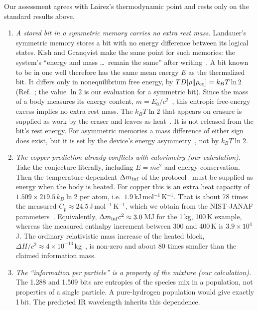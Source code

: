 Our assessment agrees with Lairez's thermodynamic point and rests only on the standard results
above.
\begin{enumerate}
\item \emph{A stored bit in a symmetric memory carries no extra rest mass.} Landauer's symmetric
  memory stores a bit with no energy difference between its logical states. Kish and Granqvist
  make the same point for such memories: the system's ``energy and mass \dots\ remain the same''
  after writing~\cite{Kish2013does}. A bit known to be in one well therefore has the same mean
  energy $E$ as the thermalized bit. It differs only in nonequilibrium free energy, by
  $T D[\rho\Vert\rho_{\rm eq}]=k_BT\ln2$ (Ref.~\cite{Esposito2011second}; the value $\ln 2$ is our
  evaluation for a symmetric bit). Since the mass of a body
  measures its energy content, $m=E_0/c^2$~\cite{Okun2008einstein}, this entropic free-energy
  excess implies no extra rest mass. The $k_BT\ln 2$ that appears on erasure is supplied as work
  by the eraser and leaves as heat~\cite{Jun2014high,Bennett2003notes}. It is not released from
  the bit's rest energy. For asymmetric memories a mass difference of either sign does exist, but
  it is set by the device's energy asymmetry~\cite{Kish2013does}, not by $k_BT\ln2$.
\item \emph{The copper prediction already conflicts with calorimetry (our calculation).} Take the
  conjecture literally, including $E=mc^2$ and energy conservation. Then the temperature-dependent
  $\Delta m_{\rm inf}$ of the protocol~\cite{Vopson2022experimental} must be supplied as energy
  when the body is heated. For copper this is an extra heat capacity of
  $1.509\times219.5\,k_B\ln2$ per atom, i.e.\ $1.9$\,kJ\,mol$^{-1}$\,K$^{-1}$. That is about 78
  times the measured $C_p\approx24.5$\,J\,mol$^{-1}$\,K$^{-1}$, which we obtain from the
  NIST-JANAF parameters~\cite{NIST2026copper}. Equivalently, $\Delta m_{\rm inf}c^2\approx3.0$\,MJ
  for the 1\,kg, 100\,K example, whereas the measured enthalpy increment between 300 and 400\,K is
  $3.9\times10^{4}$\,J. The ordinary relativistic mass increase of the heated block,
  $\Delta H/c^2\approx4\times10^{-13}$\,kg~\cite{Okun2008einstein}, is non-zero and about 80 times smaller than the
  claimed information mass.
\item \emph{The ``information per particle'' is a property of the mixture (our calculation).} The
  1.288 and 1.509 bits are entropies of the species mix in a population, not properties of a
  single particle. A pure-hydrogen population would give exactly 1\,bit. The predicted IR
  wavelength inherits this dependence.
\end{enumerate}

